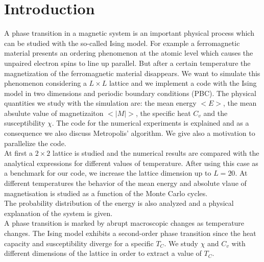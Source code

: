 \documentclass[%
preprint,
 amsmath,amssymb,
 aps,
]{revtex4-1}
\theoremstyle{plain}
\theoremstyle{definition}
\theoremstyle{plain}
\begin{document}


\section{Introduction}
A phase transition in a magnetic system is an important physical process which can be studied with the so-called Ising model. For example a ferromagnetic material presents an ordering phenomenon at the atomic level which causes the unpaired electron spins to line up parallel. But after a certain temperature the magnetization of the ferromagnetic material disappears. We want to simulate this phenomenon considering a $L\times L$ lattice and we implement a code with the Ising model in two dimensions and periodic boundary conditions (PBC). The physical quantities we study with the simulation are: the mean energy $<E>$, the mean absulute value of magnetizaiton $<|M|>$, the specific heat $C_v$ and the susceptibility $\chi$. The code for the numerical experiments is explained and as a consequence we also discuss Metropolis' algorithm. We give also a motivation to parallelize the code. \\
At first a $2 \times 2$ lattice is studied and the numerical results are compared with the analytical expressions for different values of temperature. After using this case as a benchmark for our code, we increase the lattice dimension up to $L=20$. At different temperatures the behavior of the mean energy and absolute vlaue of magnetisation is studied as a function of the Monte Carlo cycles. \\
The probability distribution of the energy is also analyzed and a physical explanation of the system is given. \\
A phase transition is marked by abrupt macroscopic changes as temperature changes. The Ising model exhibits a second-order phase transition since the heat capacity and susceptibility diverge for a specific $T_C$. We study $\chi$ and $C_v$ with different dimensions of the lattice in order to extract a value of $T_C$. 
\end{document}
